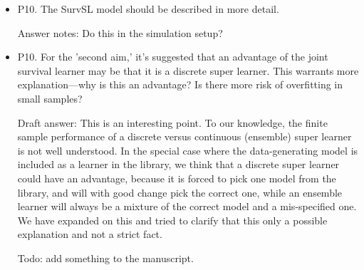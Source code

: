 \documentclass[a4paper,danish]{article}
\newcommand{\E}{{\ensuremath{\mathop{{\mathbb{E}}}}}}
\newcommand{\1}{\mathds{1}}
\newcommand{\qrev}[1]{
\vspace{.5em}
\begin{tcolorbox}[boxrule=0pt]
\hfill{\it\footnotesize Quote from revised manuscript}\\[.5em]
#1
\end{tcolorbox}
}
\newcommand{\qold}[1]{
\vspace{.5em}
\begin{tcolorbox}[boxrule=0pt,colback=pink]
\hfill{\it\footnotesize Quote from old version of manuscript}\\[.5em]
#1
\end{tcolorbox}
}
\newcommand{\answer}[1]{{\vspace{1em}{\bf #1}\vspace{1em}}}
\begin{document}
\begin{itemize}
\answer{We have now defined the IPA explicitly, please see our
  response to Reviewer 1's first. The IPA is just a scaled version of the Brier score so it
  is indeed proper.}


\end{itemize}


\begin{itemize}
\item P10. The SurvSL model should be described in more detail.

Answer notes: Do this in the simulation setup?

\item P10. For the 'second aim,' it's suggested that an advantage of the
joint survival learner may be that it is a discrete super
learner. This warrants more explanation—why is this an advantage? Is
there more risk of overfitting in small samples?

Draft answer: This is an interesting point. To our knowledge, the
finite sample performance of a discrete versus continuous (ensemble)
super learner is not well understood. In the special case where the
data-generating model is included as a learner in the library, we
think that a discrete super learner could have an advantage, because
it is forced to pick one model from the library, and will with good
change pick the correct one, while an ensemble learner will always
be a mixture of the correct model and a mis-specified one. We have
expanded on this and tried to clarify that this only a possible
explanation and not a strict fact.

Todo: add something to the manuscript.
\end{itemize}
\end{document}
